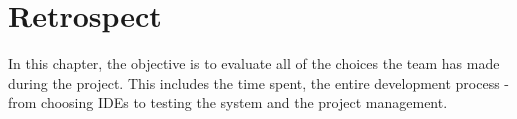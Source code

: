 \chapter{Retrospect}
In this chapter, the objective is to evaluate all of the choices the team has made during the project. This includes the time spent, the entire development process - from choosing IDEs to testing the system and the project management. 












\begin{comment}

\section{Development process}
In this section all of the problems and solutions related to the development process will be discussed and evaluated. This involves problems related to scrum, to the team organization and the technical choices the team has made during the project. 
\end{comment}




